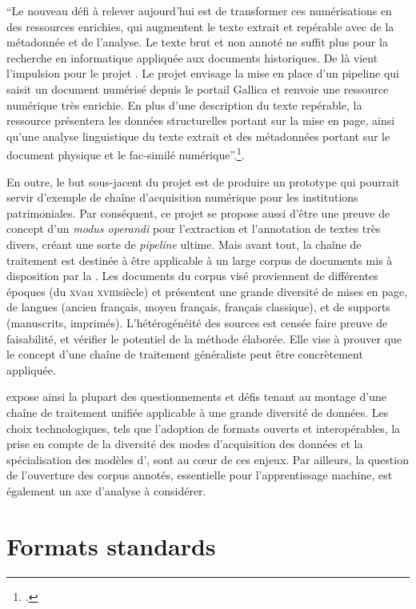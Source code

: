 \begin{kwote}  
``Le nouveau défi à relever aujourd'hui est de transformer ces
numérisations en des ressources enrichies, qui augmentent le texte
extrait et repérable avec de la métadonnée et de l'analyse. Le texte
brut et non annoté ne suffit plus pour la recherche en informatique
appliquée aux documents historiques. De là vient l'impulsion pour le
projet \gaga. Le projet envisage la mise en place d'un pipeline
qui saisit un document numérisé depuis le portail Gallica et renvoie une
ressource numérique très enrichie. En plus d'une description du texte
repérable, la ressource présentera les données structurelles portant sur
la mise en page, ainsi qu'une analyse linguistique du texte extrait et
des métadonnées portant sur le document physique et le fac-similé
numérique''.\footcite{christensen_gallicorpor_2022}.
\end{kwote}

En outre, le but sous-jacent du projet est de produire un prototype qui
pourrait servir d'exemple de chaîne d'acquisition
numérique pour les institutions
patrimoniales. Par conséquent, ce projet se propose aussi d'être une
preuve de concept d'un \emph{modus operandi} pour l'extraction et
l'annotation de textes très divers, créant une sorte de \textit{pipeline} ultime. Mais avant tout, la chaîne de traitement est destinée à être applicable
à un large corpus de documents mis à disposition par la \bnf. Les
documents du corpus visé proviennent de différentes époques (du \textsc{xv}\ieme au
\textsc{xviii}\ieme siècle) et présentent une grande diversité de mises en page, de
langues (ancien français, moyen français, français classique), et de
supports (manuscrits, imprimés). L'hétérogénéité des sources est censée
faire preuve de faisabilité, et vérifier le potentiel de la méthode
élaborée. Elle vise à prouver que le concept d'une chaîne de traitement
généraliste peut être concrètement appliquée.

\gaga expose ainsi la plupart des questionnements et défis
tenant au montage d'une chaîne de traitement unifiée applicable à une
grande diversité de données. Les choix technologiques, tels que
l'adoption de formats ouverts et interopérables, la prise en compte de
la diversité des modes d'acquisition des données et la spécialisation
des modèles d'\ia, sont au cœur de ces enjeux. Par ailleurs, la question
de l'ouverture des corpus annotés, essentielle pour l'apprentissage
machine, est également un axe d'analyse à considérer.

                \hypertarget{formats-standards}{\section{%
                Formats standards}\label{formats-standards}}
                    
                    
